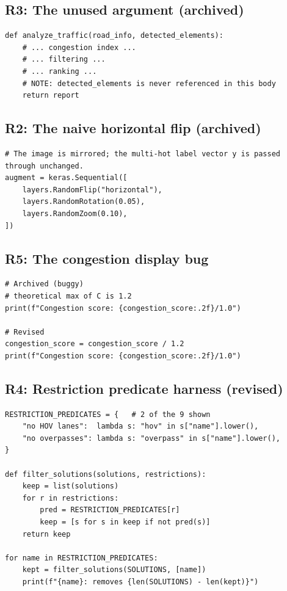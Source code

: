 \documentclass[11pt]{article}
\begin{document}
\subsection{R3: The unused argument (archived)}
\begin{lstlisting}[caption={Archived analysis function. The detected-elements argument is never referenced in the body.},label={lst:unused}]
def analyze_traffic(road_info, detected_elements):
    # ... congestion index ...
    # ... filtering ...
    # ... ranking ...
    # NOTE: detected_elements is never referenced in this body
    return report
\end{lstlisting}

\subsection{R2: The naive horizontal flip (archived)}
\begin{lstlisting}[caption={Archived horizontal flip. The image is mirrored; the multi-hot label vector is passed through unchanged.},label={lst:flip}]
# The image is mirrored; the multi-hot label vector y is passed through unchanged.
augment = keras.Sequential([
    layers.RandomFlip("horizontal"),
    layers.RandomRotation(0.05),
    layers.RandomZoom(0.10),
])
\end{lstlisting}

\subsection{R5: The congestion display bug}
\begin{lstlisting}[caption={Archived display: the raw index (max 1.2) is printed as if it were out of 1.0. Revised code divides by 1.2 before display and rescales the thresholds.},label={lst:display}]
# Archived (buggy)
# theoretical max of C is 1.2
print(f"Congestion score: {congestion_score:.2f}/1.0")

# Revised
congestion_score = congestion_score / 1.2
print(f"Congestion score: {congestion_score:.2f}/1.0")
\end{lstlisting}

\clearpage
\subsection{R4: Restriction predicate harness (revised)}
\begin{lstlisting}[caption={Revised registry: each restriction has one predicate. The harness prints the removal count for every predicate against the 30-option library.},label={lst:registry}]
RESTRICTION_PREDICATES = {   # 2 of the 9 shown
    "no HOV lanes":  lambda s: "hov" in s["name"].lower(),
    "no overpasses": lambda s: "overpass" in s["name"].lower(),
}

def filter_solutions(solutions, restrictions):
    keep = list(solutions)
    for r in restrictions:
        pred = RESTRICTION_PREDICATES[r]
        keep = [s for s in keep if not pred(s)]
    return keep

for name in RESTRICTION_PREDICATES:
    kept = filter_solutions(SOLUTIONS, [name])
    print(f"{name}: removes {len(SOLUTIONS) - len(kept)}")
\end{lstlisting}
\end{document}
